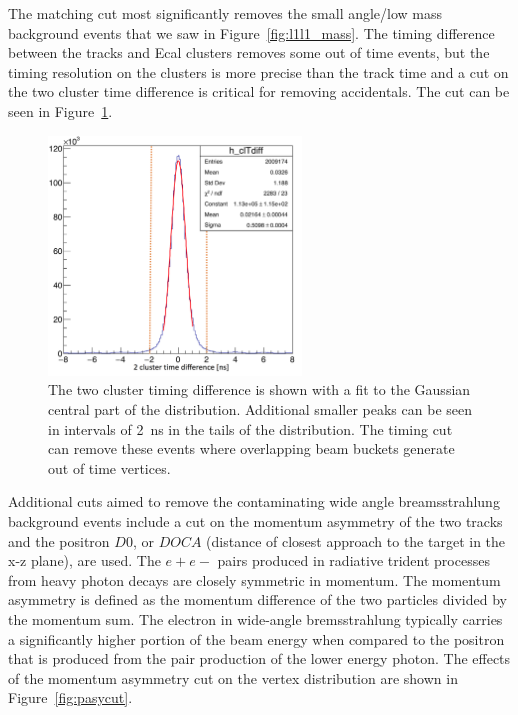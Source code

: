 \documentclass[twoside]{article}
\begin{document}
The matching cut most significantly removes the small angle/low mass background events that we saw in Figure~\ref{fig:l1l1_mass}. The timing difference between the tracks and Ecal clusters removes some out of time events, but the timing resolution on the clusters is more precise than the track time and a cut on the two cluster time difference is critical for removing accidentals. The cut can be seen in Figure~\ref{fig:cltdiff}.

\begin{figure}[H]
  \centering
      \includegraphics[width=0.6\textwidth]{plots/cltdiff.png}
  \caption{The two cluster timing difference is shown with a fit to the Gaussian central part of the distribution. Additional smaller peaks can be seen in intervals of 2~ns in the tails of the distribution. The timing cut can remove these events where overlapping beam buckets generate out of time vertices.}
  \label{fig:cltdiff}
\end{figure} 

Additional cuts aimed to remove the contaminating wide angle breamsstrahlung background events include a cut on the momentum asymmetry of the two tracks and the positron $D0$, or $DOCA$ (distance of closest approach to the target in the x-z plane), are used. The $e+e-$ pairs produced in radiative trident processes from heavy photon decays are closely symmetric in momentum. The momentum asymmetry is defined as the momentum difference of the two particles divided by the momentum sum. The electron in wide-angle bremsstrahlung typically carries a significantly higher portion of the beam energy when compared to the positron that is produced from the pair production of the lower energy photon. The effects of the momentum asymmetry cut on the vertex distribution are shown in Figure~\ref{fig:pasycut}.
\end{document}
